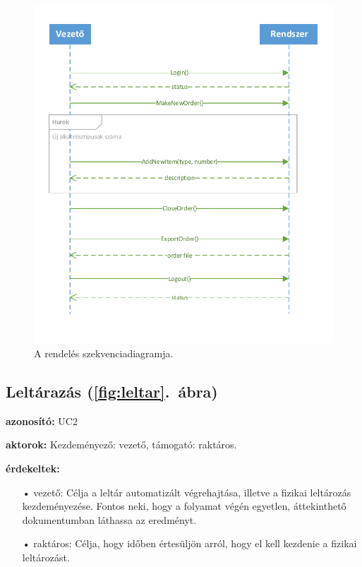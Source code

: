 \documentclass[12pt]{article}\usepackage[left=20mm,right=20mm,top=14mm,bottom=20mm]{geometry}
\begin{document}
\begin{figure}[!h]
    \centering
        \includegraphics[width=\textwidth]{kepek/rendeles_SD.pdf}
        \caption{A rendelés szekvenciadiagramja. \label{fig:rendeles}}
\end{figure}

\subsection{Leltárazás (\ref{fig:leltar}.~ábra)}
\noindent\textbf{azonosító: } UC2
\vspace{4mm}

\noindent\textbf{aktorok: } Kezdeményező: vezető, támogató: raktáros.
\vspace{4mm}

\noindent\textbf{érdekeltek: }
\vspace*{-3mm}
\begin{itemize}
\item[•] vezető: Célja a leltár automatizált végrehajtása, illetve a fizikai leltározás kezdeményezése. Fontos neki, hogy a folyamat végén egyetlen, áttekinthető dokumentumban láthassa az eredményt.

\item[•] raktáros: Célja, hogy időben értesüljön arról, hogy el kell kezdenie a fizikai leltározást. 
\end{itemize}
\vspace{4mm}
\end{document}

